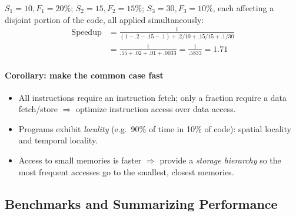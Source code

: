 \begin{eg}
$S_1=10, F_1=20\%$; $S_2=15, F_2=15\%$; $S_3=30, F_3=10\%$, each affecting a
disjoint portion of the code, all applied simultaneously:
\begin{align*}
  \text{Speedup} &= \frac{1}{(1-.2-.15-.1) + .2/10 + .15/15 + .1/30}\\
  &= \frac{1}{.55 + .02 + .01 + .0033} = \frac{1}{.5833} = 1.71
\end{align*}
\end{eg}

\paragraph{Corollary: make the common case fast}
\begin{itemize}
  \item All instructions require an instruction fetch; only a fraction
  require a data fetch/store $\Rightarrow$ optimize instruction access over
  data access.
  \item Programs exhibit \emph{locality} (e.g.\ 90\% of time in 10\% of
  code): spatial locality and temporal locality.
  \item Access to small memories is faster $\Rightarrow$ provide a
  \emph{storage hierarchy} so the most frequent accesses go to the
  smallest, closest memories.
\end{itemize}
\begin{center}\begin{minipage}{\linewidth}\centering
{}
\end{minipage}
\end{center}

\subsection{Benchmarks and Summarizing Performance}
\label{sec:benchmarking}

